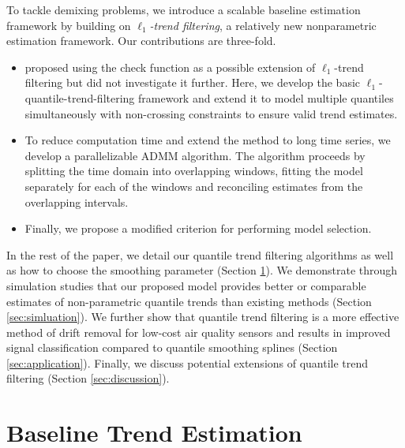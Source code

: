 \documentclass[aoas]{imsart}
\begin{document}
To tackle demixing problems, we introduce a scalable baseline estimation framework by building on \textit{$\ell_1$-trend filtering}, a relatively new nonparametric estimation framework. Our contributions are three-fold.
\begin{itemize}
	\item \cite{Kim2009} proposed using the check function as a possible extension of $\ell_1$-trend filtering but did not investigate it further. Here, we develop the basic $\ell_1$-quantile-trend-filtering framework and extend it to model multiple quantiles simultaneously with non-crossing constraints to ensure valid trend estimates.
	\item To reduce computation time and extend the method to long time series, we develop a parallelizable ADMM algorithm. The algorithm proceeds by splitting the time domain into overlapping windows, fitting the model separately for each of the windows and reconciling estimates from the overlapping intervals.
	\item Finally, we propose a modified criterion for performing model selection.
\end{itemize}

In the rest of the paper, we detail our quantile trend filtering algorithms as well as how to choose the smoothing parameter (Section \ref{sec:methods}). We demonstrate through simulation studies that our proposed model provides better or comparable estimates of non-parametric quantile trends than existing methods (Section \ref{sec:simluation}). We further show that quantile trend filtering is a more effective method of drift removal for low-cost air quality sensors and results in improved signal classification compared to quantile smoothing splines (Section \ref{sec:application}). Finally, we discuss potential extensions of quantile trend filtering (Section \ref{sec:discussion}).

\section{Baseline Trend Estimation}
\label{sec:methods}

\end{document}
